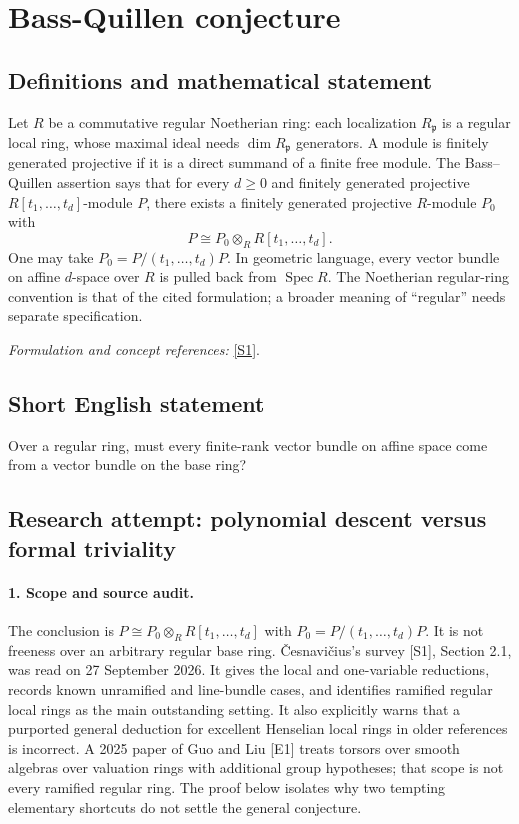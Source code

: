 \documentclass[11pt]{article}
\begin{document}
\section*{\texorpdfstring{Bass-Quillen conjecture}{Bass-Quillen conjecture}}\label{312}
\subsection{Definitions and mathematical statement}
Let $R$ be a commutative regular Noetherian ring: each localization $R_{\mathfrak p}$ is a regular local ring, whose maximal ideal needs $\dim R_{\mathfrak p}$ generators. A module is finitely generated projective if it is a direct summand of a finite free module. The Bass--Quillen assertion says that for every $d\ge0$ and finitely generated projective $R[t_1,\ldots,t_d]$-module $P$, there exists a finitely generated projective $R$-module $P_0$ with
\[
 P\cong P_0\otimes_R R[t_1,\ldots,t_d].
\]
One may take $P_0=P/(t_1,\ldots,t_d)P$. In geometric language, every vector bundle on affine $d$-space over $R$ is pulled back from $\operatorname{Spec}R$. The Noetherian regular-ring convention is that of the cited formulation; a broader meaning of ``regular'' needs separate specification.
\par\smallskip\textit{Formulation and concept references:} \href{https://arxiv.org/html/2201.06424v4}{[S1]}.

\subsection{Short English statement}
Over a regular ring, must every finite-rank vector bundle on affine space come from a vector bundle on the base ring?
\subsection{Research attempt: polynomial descent versus formal triviality}
\paragraph{1. Scope and source audit.}
The conclusion is $P\cong P_0\otimes_R R[t_1,\ldots,t_d]$ with $P_0=P/(t_1,\ldots,t_d)P$. It is not freeness over an arbitrary regular base ring. \v{C}esnavi\v{c}ius's survey [S1], Section 2.1, was read on 27 September 2026. It gives the local and one-variable reductions, records known unramified and line-bundle cases, and identifies ramified regular local rings as the main outstanding setting. It also explicitly warns that a purported general deduction for excellent Henselian local rings in older references is incorrect. A 2025 paper of Guo and Liu [E1] treats torsors over smooth algebras over valuation rings with additional group hypotheses; that scope is not every ramified regular ring. The proof below isolates why two tempting elementary shortcuts do not settle the general conjecture.
\end{document}
